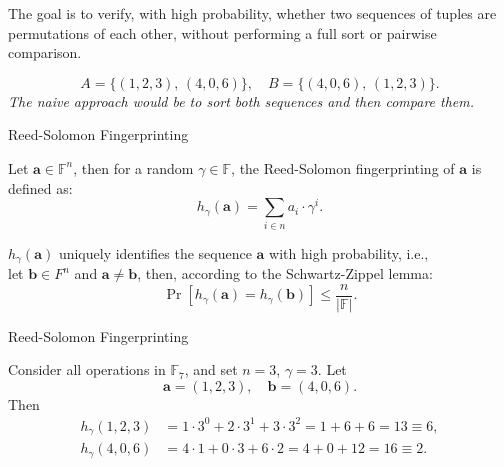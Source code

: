 \documentclass{zkdl-presentation-template}
\begin{document}
    \begin{frame}
        The goal is to verify, with high probability, whether two sequences of tuples
        are permutations of each other, without performing a full sort or pairwise comparison.

        
        \begin{equation*}
        A = \{(1,2,3),\,(4,0,6)\}, \quad
        B = \{(4,0,6),\,(1,2,3)\}.
        \end{equation*}
        \textit{The naive approach would be to sort both sequences and then compare them.}
    \end{frame}

    \begin{frame}{Reed-Solomon Fingerprinting}
        \begin{definition}
            Let $\mathbf{a} \in \mathbb{F}^{n}$, then for a random $\gamma \in \mathbb{F}$, the Reed-Solomon 
            fingerprinting of $\mathbf{a}$ is defined as:
            \begin{equation*}
                h_{\gamma}(\mathbf{a}) = \sum_{i \in n} a_i \cdot \gamma^i.
            \end{equation*}

            
            $h_{\gamma}(\mathbf{a})$ uniquely identifies the sequence $\mathbf{a}$ with high probability,
            i.e., \\let $\mathbf{b} \in F^n$ and $\mathbf{a} \neq \mathbf{b}$, then, according to the Schwartz-Zippel lemma:
            \begin{equation*}
                \Pr[h_{\gamma}(\mathbf{a}) = h_{\gamma}(\mathbf{b})] \leq \frac{n}{|\mathbb{F}|}.
            \end{equation*}
        \end{definition}
    \end{frame}

    \begin{frame}{Reed-Solomon Fingerprinting}
        \begin{example}
            Consider all operations in $\mathbb{F}_7$, and set $n=3$, $\gamma=3$.  
            Let
            \begin{equation*}
                \mathbf{a} = (1,2,3), \quad \mathbf{b} = (4,0,6).
            \end{equation*}
            Then
            \begin{align*}
                h_{\gamma}(1,2,3) &=1\cdot3^0 + 2\cdot3^1 + 3\cdot3^2 =1 + 6 + 6 =13 \equiv 6,\\
                h_{\gamma}(4,0,6) &=4\cdot1 + 0\cdot3 + 6\cdot2 =4 + 0 + 12 =16 \equiv 2.
            \end{align*}
        \end{example}
    \end{frame}
\end{document}
